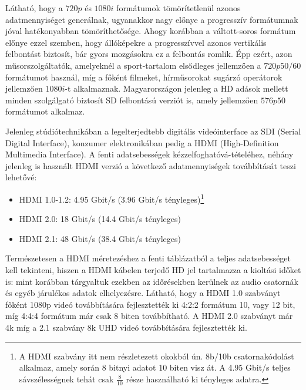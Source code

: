 %
Látható, hogy a $720p$ és $1080i$ formátumok tömörítetlenül azonos adatmennyiséget generálnak, ugyanakkor nagy előnye a progresszív formátumnak jóval hatékonyabban tömöríthetősége.
Ahogy korábban a váltott-soros formátum előnye ezzel szemben, hogy állóképekre a progresszívvel azonos vertikális felbontást biztosít, bár gyors mozgásokra ez a felbontás romlik.
Épp ezért, azon műsorszolgáltatók, amelyeknél a sport-tartalom elsődleges jellemzően a $720p50/60$ formátumot használ, míg a főként filmeket, hírműsorokat sugárzó operátorok jellemzően $1080i$-t alkalmaznak.
Magyarországon jelenleg a HD adások mellett minden szolgálgató biztosít SD felbontású verziót is, amely jellemzően $576p50$ formátumot alkalmaz.

Jelenleg stúdiótechnikában a legelterjedtebb digitális videóinterface az SDI (Serial Digital Interface), konzumer elektronikában pedig a HDMI (High-Definition Multimedia Interface).
A fenti adatsebességek kézzelfoghatóvá-tételéhez, néhány jelenleg is használt HDMI verzió a következő adatmennyiségek továbbítását teszi lehetővé:
\begin{itemize}
\item HDMI 1.0-1.2: 4.95 Gbit/s (3.96 Gbit/s tényleges)\footnote{A HDMI szabvány itt nem részletezett okokból ún. 8b/10b csatornakódolást alkalmaz, amely során 8 bitnyi adatot 10 biten visz át.
A 4.95 Gbit/s teljes sávszélességnek tehát csak $\frac{8}{10}$ része használható ki tényleges adatra.}
\item HDMI 2.0: 18 Gbit/s (14.4 Gbit/s tényleges)
\item HDMI 2.1: 48 Gbit/s (38.4 Gbit/s tényleges)
\end{itemize}
Természetesen a HDMI méretezéshez a fenti táblázatból a teljes adatsebességet kell tekinteni, hiszen a HDMI kábelen terjedő HD jel tartalmazza a kioltási időket is: mint korábban tárgyaltuk ezekben az időrésekben kerülnek az audio csatornák és egyéb járulékos adatok elhelyezésre.
Látható, hogy a HDMI 1.0 szabványt főként 1080p videó továbbítására fejlesztették ki 4:2:2 formátum 10, vagy 12 bit, míg 4:4:4 formátum már csak 8 biten továbbítható.
A HDMI 2.0 szabványt már 4k míg a 2.1 szabvány 8k UHD videó továbbítására fejlesztették ki.





